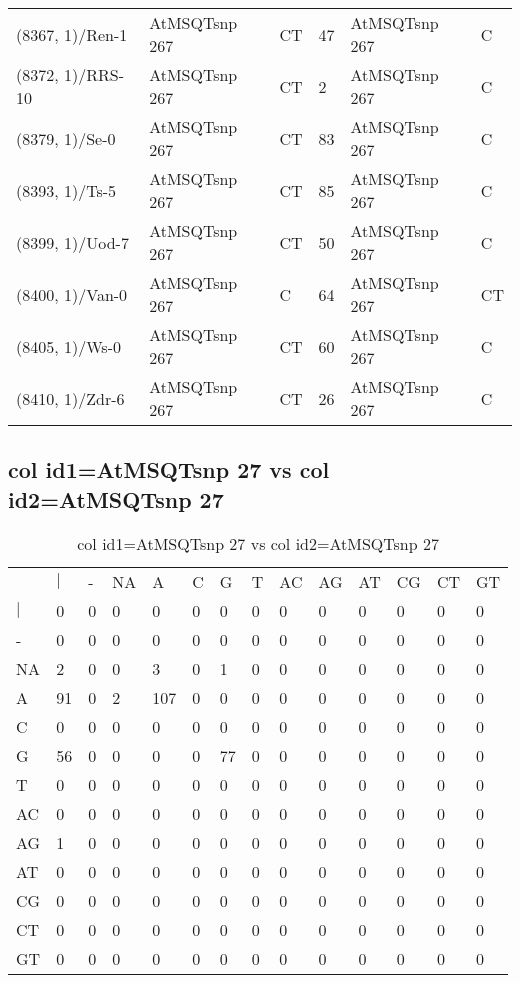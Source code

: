 \begin{center}
\begin{longtable}{|l|l|l|l|l|l|}
(8367, 1)/Ren-1&AtMSQTsnp 267&CT&47&AtMSQTsnp 267&C\\
(8372, 1)/RRS-10&AtMSQTsnp 267&CT&2&AtMSQTsnp 267&C\\
(8379, 1)/Se-0&AtMSQTsnp 267&CT&83&AtMSQTsnp 267&C\\
(8393, 1)/Ts-5&AtMSQTsnp 267&CT&85&AtMSQTsnp 267&C\\
(8399, 1)/Uod-7&AtMSQTsnp 267&CT&50&AtMSQTsnp 267&C\\
(8400, 1)/Van-0&AtMSQTsnp 267&C&64&AtMSQTsnp 267&CT\\
(8405, 1)/Ws-0&AtMSQTsnp 267&CT&60&AtMSQTsnp 267&C\\
(8410, 1)/Zdr-6&AtMSQTsnp 267&CT&26&AtMSQTsnp 267&C\\
\hline
\end{longtable}
\end{center}

\subsection{col id1=AtMSQTsnp 27 vs col id2=AtMSQTsnp 27}
\begin{center}
\begin{longtable}{|l|l|l|l|l|l|l|l|l|l|l|l|l|l|}
\caption{col id1=AtMSQTsnp 27 vs col id2=AtMSQTsnp 27} \label{table_dm808}\\
\hline
\\
\hline
&$|$&-&NA&A&C&G&T&AC&AG&AT&CG&CT&GT\\
$|$&0&0&0&0&0&0&0&0&0&0&0&0&0\\
-&0&0&0&0&0&0&0&0&0&0&0&0&0\\
NA&2&0&0&3&0&1&0&0&0&0&0&0&0\\
A&91&0&2&107&0&0&0&0&0&0&0&0&0\\
C&0&0&0&0&0&0&0&0&0&0&0&0&0\\
G&56&0&0&0&0&77&0&0&0&0&0&0&0\\
T&0&0&0&0&0&0&0&0&0&0&0&0&0\\
AC&0&0&0&0&0&0&0&0&0&0&0&0&0\\
AG&1&0&0&0&0&0&0&0&0&0&0&0&0\\
AT&0&0&0&0&0&0&0&0&0&0&0&0&0\\
CG&0&0&0&0&0&0&0&0&0&0&0&0&0\\
CT&0&0&0&0&0&0&0&0&0&0&0&0&0\\
GT&0&0&0&0&0&0&0&0&0&0&0&0&0\\
\hline
\end{longtable}
\end{center}

